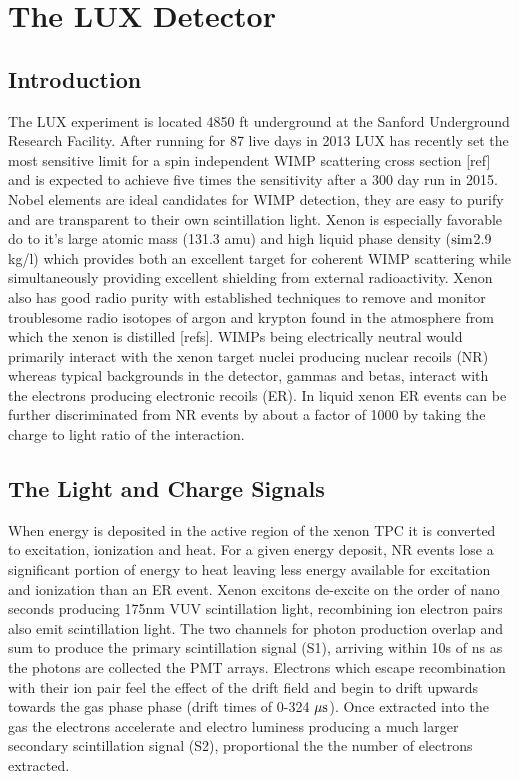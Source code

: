 

\renewcommand{\thechapter}{2}

\chapter{The LUX Detector}

\section{Introduction}

The LUX experiment is located 4850 ft underground at the Sanford Underground Research Facility. After running for 87 live days in 2013 LUX has recently set the most sensitive limit for a spin independent WIMP scattering cross section [ref] and is expected to achieve five times the sensitivity after a 300 day run in 2015. Nobel elements are ideal candidates for WIMP detection, they are easy to purify and are transparent to their own scintillation light. Xenon is especially favorable do to it's  large atomic mass (131.3 amu) and high liquid phase density ($\rm sim$2.9 kg/l) which provides both an excellent target for coherent WIMP scattering while simultaneously providing excellent shielding from external radioactivity. Xenon also has good radio purity with established techniques to remove and monitor troublesome radio isotopes of argon and krypton found in the atmosphere from which the xenon is distilled [refs]. 
WIMPs being electrically neutral would primarily interact with the xenon target nuclei producing nuclear recoils (NR) whereas typical backgrounds in the detector, gammas and betas, interact with the electrons producing electronic recoils (ER). In liquid xenon ER events can be further discriminated from NR events by about a factor of 1000 by taking the charge to light ratio of the interaction.

\section{The Light and Charge Signals}

When energy is deposited in the active region of the xenon TPC it is converted to excitation, ionization and heat. For a given energy deposit, NR events lose a significant portion of energy to heat leaving less energy available for excitation and ionization than an ER event. Xenon excitons de-excite on the order of nano seconds producing 175nm VUV scintillation light, recombining ion electron pairs also emit scintillation light. The two channels for photon production overlap and sum to produce the primary scintillation signal (S1), arriving within 10s of ns as the photons are collected the  PMT arrays. Electrons which escape recombination with their ion pair feel the effect of the drift field and begin to drift upwards towards the gas phase phase (drift times of 0-324 $\rm \mu s$). Once extracted into the gas the electrons accelerate and electro luminess producing a much larger secondary scintillation signal (S2), proportional the the number of electrons extracted. 


